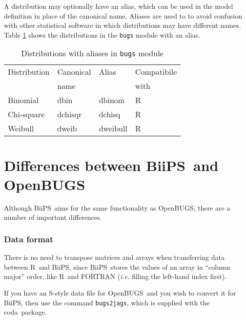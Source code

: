 \documentclass[11pt, a4paper, titlepage]{report}
\newcommand{\biips}{\textsf{BiiPS}}
\newcommand{\OpenBUGS}{\textsf{OpenBUGS}}
\newcommand{\R}{\textsf{R}}
\newcommand{\CODA}{\textsf{coda}}
\begin{document}
A distribution may optionally have an alias, which can be used in the
model definition in place of the canonical name. Aliases are used to
to avoid confusion with other statistical software in which
distributions may have different names. Table
\ref{table:bugs:distributions:alias} shows the distributions in the
\texttt{bugs} module with an alias.

\begin{table}[h!]
\begin{center}
\begin{tabular}{llll}
\hline
Distribution & Canonical & Alias & Compatibile  \\
             & name      &       & with         \\
\hline
Binomial           & dbin      & dbinom   & R   \\
Chi-square         & dchisqr   & dchisq   & R   \\ 
Weibull            & dweib     & dweibull & R   \\ 
\hline
\end{tabular}
\caption{Distributions with aliases in \texttt{bugs} module
  \label{table:bugs:distributions:alias}}
\end{center}
\end{table}

\chapter{Differences between \biips\ and \OpenBUGS}

Although \biips\ aims for the same functionality as \OpenBUGS, there are
a number of important differences.

\subsection{Data format}

There is no need to transpose matrices and arrays when transferring
data between \R\ and \biips, since \biips\ stores the values of an array
in ``column major'' order, like \R\ and FORTRAN ({\em i.e.} filling
the left-hand index first).

If you have an \textsf{S}-style data file for \OpenBUGS\ and you wish
to convert it for \biips, then use the command \texttt{bugs2jags},
which is supplied with the \CODA\ package.
\end{document}
